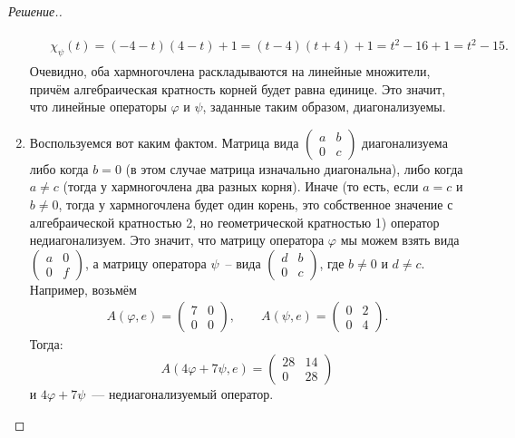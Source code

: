 \documentclass[a4paper]{article}
\theoremstyle{remark}
\begin{document}
\begin{proof}[Решение.]
\begin{enumerate}[label=\arabic*)]
\begin{align*}
            &\begin{aligned}
              \chi_\psi(t) = (-4 - t)(4 - t) + 1 = (t - 4)(t + 4) + 1 = t^2 - 16 + 1 = t^2 - 15. 
            \end{aligned}
          \end{align*}
          Очевидно, оба хармногочлена раскладываются на линейные множители, причём алгебраическая кратность корней будет равна единице. Это значит, что линейные операторы $\varphi$ и $\psi$, заданные таким образом, диагонализуемы.
          \item Воспользуемся вот каким фактом. Матрица вида $\begin{pmatrix}
            a & b \\
            0 & c
          \end{pmatrix}$ диагонализуема либо когда $b = 0$ (в этом случае матрица изначально диагональна), либо когда $a \neq c$ (тогда у хармногочлена два разных корня). Иначе (то есть, если $a = c$ и $b \neq 0$, тогда у хармногочлена будет один корень, это собственное значение с алгебраической кратностью 2, но геометрической кратностью 1) оператор недиагонализуем. Это значит, что матрицу оператора $\varphi$ мы можем взять вида $\begin{pmatrix}
            a & 0 \\
            0 & f
          \end{pmatrix}$, а матрицу оператора $\psi$~-- вида $\begin{pmatrix}
            d & b \\
            0 & c
          \end{pmatrix}$, где $b \neq 0$ и $d \neq c$.
          Например, возьмём 
          \begin{align*}
            A(\varphi, e) = \begin{pmatrix}
              7 & 0 \\
              0 & 0
            \end{pmatrix}, \quad\quad A(\psi, e) = \begin{pmatrix}
              0 & 2 \\
              0 & 4
            \end{pmatrix}.
          \end{align*}
          Тогда:
          \begin{equation*}
            A(4\varphi + 7\psi, e) = \begin{pmatrix}
              28 & 14 \\
              0 & 28
            \end{pmatrix}
          \end{equation*}
          и $4\varphi + 7\psi$~--- недиагонализуемый оператор.
        \end{enumerate}

        \end{proof}
    
\end{document}
